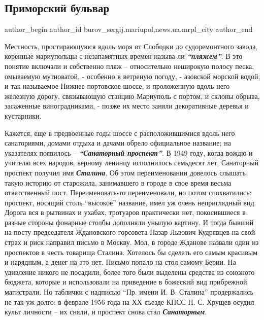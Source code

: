  
 
 
 
 
 
\subsection{Приморский бульвар}
\label{sec:16_06_2018.stz.news.ua.mrpl_city.1.primorskij_bulvar}
 
\ifcmt
 author_begin
   author_id burov_sergij.mariupol,news.ua.mrpl_city
 author_end
\fi

Местность, простирающуюся вдоль моря от Слободки до судоремонтного завода,
коренные мариупольцы с незапамятных времен называ\hyp{}ли \textbf{\em\enquote{пляжем}}. В это понятие
включали и собственно пляж – относительно неширокую полосу песка, омываемую
мутноватой, - особенно в ветреную погоду, - азовской морской водой, и так
называемое Нижнее портовское шоссе, и проложенную вдоль него железную дорогу,
связывающую станцию Мариуполь с портом, и склоны обрыва, засаженные
виноградниками, - позже их место заняли декоративные деревья и кустарники.

Кажется, еще в предвоенные годы шоссе с расположившимися вдоль него
санаториями, домами отдыха и дачами обрело официальное название; на указателях
появилось – \textbf{\emph{\enquote{Санаторный проспект}}}. В 1949 году, когда вождю и учителю всех
народов, верному ленинцу исполнилось семьдесят лет, Санаторный проспект получил
имя \emph{\textbf{Сталина}}. Об этом переименовании довелось слышать такую историю от
старожила, занимавшего в городе в свое время весьма ответственный пост.
Переименовать-то переименовали, но потом спохватились: проспект, носящий столь
\enquote{высокое} название, имел уж очень неприглядный вид. Дорога вся в рытвинах и
ухабах, тротуаров практически нет, покосившиеся в разные стороны фонарные
столбы дополняли унылую картину. И тогда бывший на посту председателя
Ждановского горсовета Назар Львович Кудрявцев на свой страх и риск направил
письмо в Москву. Мол, в городе Жданове назвали один из проспектов в честь
товарища Сталина. Хотелось бы сделать его самым красивым и нарядным, а денег на
это нет. Письмо попало на стол самому Берии. На удивление никого не посадили,
более того были выделены средства из союзного бюджета, которые и использовали
на приведение в божеский вид прибрежной магистрали. Но таблички с надписью \enquote{Пр.
имени И. В. Сталина} продержались не так уж долго: в феврале 1956 года на ХХ
съезде КПСС Н. С. Хрущев осудил культ личности – их сняли, и проспект снова стал
\textbf{\emph{Санаторным}}.

